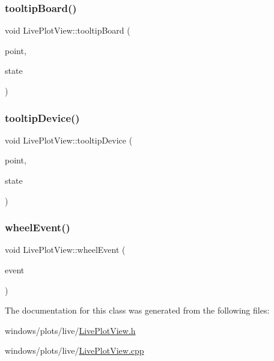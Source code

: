 \subsubsection{\texorpdfstring{tooltip\+Board()}{tooltipBoard()}}
{\footnotesize\ttfamily void Live\+Plot\+View\+::tooltip\+Board (\begin{DoxyParamCaption}\item[{Q\+PointF}]{point,  }\item[{bool}]{state }\end{DoxyParamCaption})}

\mbox{\label{class_live_plot_view_a489db6b9f626d4433a7d486487793165}} 
\subsubsection{\texorpdfstring{tooltip\+Device()}{tooltipDevice()}}
{\footnotesize\ttfamily void Live\+Plot\+View\+::tooltip\+Device (\begin{DoxyParamCaption}\item[{Q\+PointF}]{point,  }\item[{bool}]{state }\end{DoxyParamCaption})}

\mbox{\label{class_live_plot_view_adaa13a156e69554c5c132389f20973fd}} 
\subsubsection{\texorpdfstring{wheel\+Event()}{wheelEvent()}}
{\footnotesize\ttfamily void Live\+Plot\+View\+::wheel\+Event (\begin{DoxyParamCaption}\item[{Q\+Wheel\+Event $\ast$}]{event }\end{DoxyParamCaption})}



The documentation for this class was generated from the following files\+:\begin{DoxyCompactItemize}
\item 
windows/plots/live/\hyperlink{_live_plot_view_8h}{Live\+Plot\+View.\+h}\item 
windows/plots/live/\hyperlink{_live_plot_view_8cpp}{Live\+Plot\+View.\+cpp}\end{DoxyCompactItemize}
